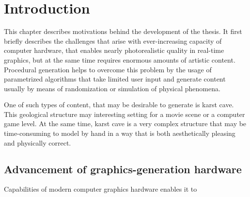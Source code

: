 \chapter{Introduction}

This chapter describes motivations behind the development of the thesis. It 
first briefly describes the challenges that arise with ever-increasing capacity 
of computer hardware, that enables nearly photorealistic quality in real-time graphics, but
at the same time requires enormous amounts of artistic content. Procedural 
generation helps to overcome this problem by the usage of parametrized
algorithms that take limited user input and generate content usually by means
of randomization or simulation of physical phenomena.

One of such types of content, that may be desirable to generate is karst cave.
This geological structure may interesting setting for a movie scene or a
computer game level. At the same time, karst cave is a very complex structure
that may be time-consuming to model by hand in a way that is both aesthetically
pleasing and physically correct.

\section{Advancement of graphics-generation hardware}

Capabilities of modern computer graphics hardware enables it to  
